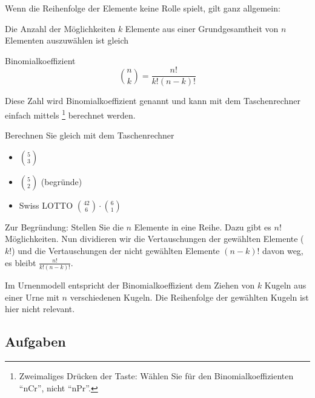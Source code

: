 Wenn die Reihenfolge der Elemente keine Rolle spielt, gilt ganz
allgemein:

Die Anzahl der Möglichkeiten $k$ Elemente aus einer Grundgesamtheit
von $n$ Elementen auszuwählen ist gleich

\begin{definition}{Binomialkoeffizient}{}
$${n\choose k} = \frac{n!}{k!(n-k)!}$$
\end{definition}

Diese Zahl wird Binomialkoeffizient genannt und kann mit dem
Taschenrechner einfach
mittels \footnote{Zweimaliges Drücken der Taste:
Wählen Sie für den Binomialkoeffizienten ``nCr'', nicht ``nPr''.}
berechnet werden.

Berechnen Sie gleich mit dem Taschenrechner
\begin{itemize}
\item $5\choose 3$
\item $5\choose 2$ (begründe) 
\item Swiss LOTTO ${42\choose 6} \cdot{} {6 \choose 1}$ 
\end{itemize}

\begin{bemerkung}{}{}
Zur Begründung: Stellen Sie die $n$ Elemente in eine Reihe. Dazu gibt
es $n!$ Möglichkeiten. Nun dividieren wir die Vertauschungen der
gewählten Elemente ($k!$) und die Vertauschungen der nicht gewählten
Elemente $(n-k)!$ davon weg, es bleibt $\frac{n!}{k!(n-k)!}$.
\end{bemerkung}

\begin{gesetz}{}{}
Im Urnenmodell entspricht der Binomialkoeffizient dem Ziehen von $k$ Kugeln aus einer
Urne mit $n$ verschiedenen Kugeln. Die Reihenfolge der gewählten
Kugeln ist hier nicht relevant.
\end{gesetz}

\subsection*{Aufgaben}

\newpage
